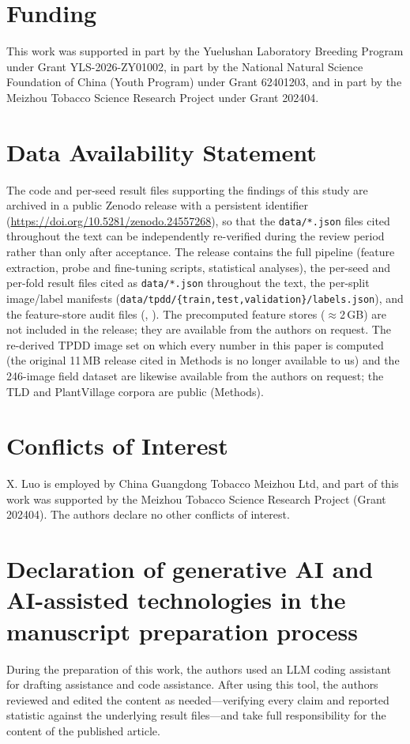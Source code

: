 \documentclass[10pt,a4paper]{article}
\begin{document}
\section*{Funding}
This work was supported in part by the Yuelushan Laboratory Breeding Program under Grant YLS-2026-ZY01002, in part by the National Natural Science Foundation of China (Youth Program) under Grant 62401203, and in part by the Meizhou Tobacco Science Research Project under Grant 202404.
\section*{Data Availability Statement}
The code and per-seed result files supporting the findings of this study are archived in a public Zenodo release with a persistent identifier (\url{https://doi.org/10.5281/zenodo.24557268}), so that the \texttt{data/*.json} files cited throughout the text can be independently re-verified during the review period rather than only after acceptance. The release contains the full pipeline (feature extraction, probe and fine-tuning scripts, statistical analyses), the per-seed and per-fold result files cited as \texttt{data/*.json} throughout the text, the per-split image/label manifests (\texttt{data/tpdd/}\allowbreak\texttt{\{train,test,validation\}}\allowbreak\texttt{/labels.json}), and the feature-store audit files (, ). The precomputed feature stores ($\approx$2\,GB) are not included in the release; they are available from the authors on request. The re-derived TPDD image set on which every number in this paper is computed (the original 11\,MB release cited in Methods is no longer available to us) and the 246-image field dataset are likewise available from the authors on request; the TLD and PlantVillage corpora are public (Methods).
\section*{Conflicts of Interest}
X. Luo is employed by China Guangdong Tobacco Meizhou Ltd, and part of this work was supported by the Meizhou Tobacco Science Research Project (Grant 202404). The authors declare no other conflicts of interest.
\section*{Declaration of generative AI and AI-assisted technologies in the manuscript preparation process}
During the preparation of this work, the authors used an LLM coding assistant for drafting assistance and code assistance. After using this tool, the authors reviewed and edited the content as needed---verifying every claim and reported statistic against the underlying result files---and take full responsibility for the content of the published article.
\end{document}
